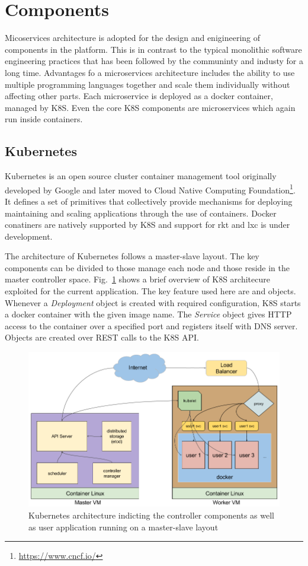 \documentclass[DD]{iitmdiss}
\begin{document}
\section{Components}
Micoservices architecture \citep{dragoni_microservices:_2016} is adopted for the design and enigineering of components in the platform. This is in contrast to the typical monolithic software engineering practices that has been followed by the communinty and industy for a long time. Advantages fo a microservices architecture includes the ability to use multiple programming languages together and scale them individually without affecting other parts. Each microservice is deployed as a docker container, managed by K8S. Even the core K8S components are microservices which again run inside containers.

\subsection{Kubernetes}
Kubernetes is an open source cluster container management tool originally developed by Google \citep{burns_borg_2016} and later moved to Cloud Native Computing Foundation\footnote{\url{https://www.cncf.io/}}. It defines a set of primitives that collectively provide mechanisms for deploying maintaining and scaling applications through the use of containers. Docker conatiners are natively supported by K8S and support for rkt and lxc is under development.

The architecture of Kubernetes follows a master-slave layout. The key components can be divided to those manage each node and those reside in the master controller space. Fig.~\ref{fig:systeminternalarch} shows a brief overview of K8S architecure exploited for the current application. The key feature used here are \textit{\cite{deployments}} and \textit{\cite{services}} objects. Whenever a \textit{Deployment} object is created with required configuration, K8S starts a docker container with the given image name. The \textit{Service} object gives HTTP access to the container over a specified port and registers itself with DNS server. Objects are created over REST calls to the K8S API.

\begin{figure}
	\centering
	\includegraphics[width=0.9\linewidth]{img/system_internal_arch}
	\caption[Kubernetes architecture]{Kubernetes architecture indicting the controller components as well as user application running on a master-slave layout}
	\label{fig:systeminternalarch}
\end{figure}
\end{document}
